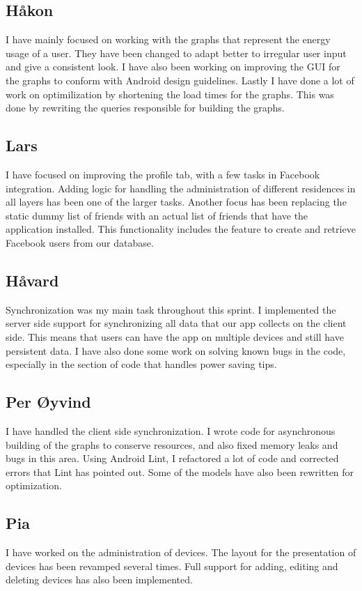 \documentclass[12pt]{article}
\begin{document}
\subsection*{Håkon}
I have mainly focused on working with the graphs that represent the energy usage of a user. They have been changed to adapt better to irregular user input and give a consistent look. I have also been working on improving the GUI for the graphs to conform with Android design guidelines. Lastly I have done a lot of work on optimilization by shortening the load times for the graphs. This was done by rewriting the queries responsible for building the graphs.

\subsection*{Lars}
I have focused on improving the profile tab, with a few tasks in Facebook integration. Adding logic for handling the administration of different residences in all layers has been one of the larger tasks. Another focus has been replacing the static dummy list of friends with an actual list of friends that have the application installed. This functionality includes the feature to create and retrieve Facebook users from our database.

\subsection*{Håvard}
Synchronization was my main task throughout this sprint. I implemented the server side support for synchronizing all data that our app collects on the client side. This means that users can have the app on multiple devices and still have persistent data. I have also done some work on solving known bugs in the code, especially in the section of code that handles power saving tips.


\subsection*{Per Øyvind}
I have handled the client side synchronization. I wrote code for asynchronous building of the graphs to conserve resources, and also fixed memory leaks and bugs in this area. Using Android Lint, I refactored a lot of code and corrected errors that Lint has pointed out. Some of the models have also been rewritten for optimization.

\subsection*{Pia}
I have worked on the administration of devices. The layout for the presentation of devices has been revamped several times. Full support for adding, editing and deleting devices has also been implemented.
\end{document}
